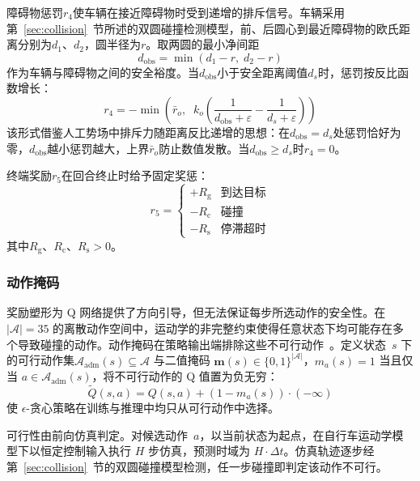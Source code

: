\documentclass{iopjournal}
\begin{document}
障碍物惩罚$r_4$使车辆在接近障碍物时受到递增的排斥信号。车辆采用第~\ref{sec:collision}~节所述的双圆碰撞检测模型，前、后圆心到最近障碍物的欧氏距离分别为$d_1$、$d_2$，圆半径为$r$。取两圆的最小净间距
\begin{equation}\label{eq:d_obs}
  d_{\text{obs}} = \min(d_1 - r,\; d_2 - r)
\end{equation}
作为车辆与障碍物之间的安全裕度。当$d_{\text{obs}}$小于安全距离阈值$d_s$时，惩罚按反比函数增长：
\begin{equation}\label{eq:reward_obs}
  r_4 = -\min\!\left(\bar{r}_o,\;\; k_o\!\left(\frac{1}{d_{\text{obs}}+\varepsilon}-\frac{1}{d_s+\varepsilon}\right)\right)
\end{equation}
该形式借鉴人工势场中排斥力随距离反比递增的思想：在$d_{\text{obs}} = d_s$处惩罚恰好为零，$d_{\text{obs}}$越小惩罚越大，上界$\bar{r}_o$防止数值发散。当$d_{\text{obs}} \geq d_s$时$r_4 = 0$。

终端奖励$r_5$在回合终止时给予固定奖惩：
\begin{equation}\label{eq:reward_term}
  r_5 =
  \begin{cases}
    +R_{\mathrm{g}}  & \text{到达目标} \\[2pt]
    -R_{\mathrm{c}}   & \text{碰撞} \\[2pt]
    -R_{\mathrm{s}} & \text{停滞超时}
  \end{cases}
\end{equation}
其中$R_{\mathrm{g}}$、$R_{\mathrm{c}}$、$R_{\mathrm{s}} > 0$。

\subsubsection{动作掩码}\label{sec:masking}

奖励塑形为 Q 网络提供了方向引导，但无法保证每步所选动作的安全性。在 $|\mathcal{A}|=35$ 的离散动作空间中，运动学的非完整约束使得任意状态下均可能存在多个导致碰撞的动作。动作掩码在策略输出端排除这些不可行动作~\cite{huang2022closer}。定义状态~$s$ 下的可行动作集$\mathcal{A}_{\mathrm{adm}}(s) \subseteq \mathcal{A}$ 与二值掩码 $\mathbf{m}(s) \in \{0,1\}^{|\mathcal{A}|}$，$m_a(s)=1$ 当且仅当 $a \in \mathcal{A}_{\mathrm{adm}}(s)$，将不可行动作的 Q 值置为负无穷：
\begin{equation}\label{eq:masked_q}
  \tilde{Q}(s,a) = Q(s,a) + (1 - m_a(s)) \cdot (-\infty)
\end{equation}
使 $\epsilon$-贪心策略在训练与推理中均只从可行动作中选择。

可行性由前向仿真判定。对候选动作~$a$，以当前状态为起点，在自行车运动学模型下以恒定控制输入执行 $H$ 步仿真，预测时域为 $H \cdot \Delta t$。仿真轨迹逐步经第~\ref{sec:collision}~节的双圆碰撞模型检测，任一步碰撞即判定该动作不可行。
\end{document}
